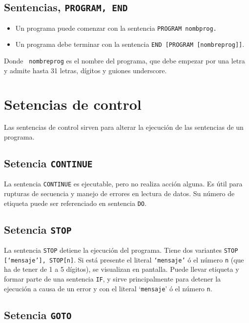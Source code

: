 \subsection{Sentencias, {\tt PROGRAM, END}}

\begin{itemize}
	\item Un programa puede comenzar con la sentencia {\tt PROGRAM nombprog.}
	\item Un programa debe terminar con la sentencia {\tt END  [PROGRAM [nombreprog]]}.
\end{itemize}
Donde \texttt{ nombreprog} es el nombre del programa, que debe empezar por una letra y admite hasta 31 letras, dígitos y guiones underscore.

\section{Setencias de control}

Las sentencias de control sirven para alterar la ejecución de las sentencias de un programa.



\subsection{Setencia {\tt CONTINUE}}

La sentencia \texttt{CONTINUE} es ejecutable, pero no realiza acción alguna. Es útil para rupturas de secuencia y manejo de errores en lectura de datos. Su número de etiqueta puede ser referenciado en sentencia \texttt{DO}.

\subsection{Setencia {\tt STOP}}

La sentencia {\tt STOP} detiene la ejecución del programa. Tiene dos variantes {\tt STOP [`mensaje'], STOP[n]}. Si está presente el literal {\tt `mensaje'} ó el número {\tt  n} (que ha de tener de 1 a 5 dígitos), se visualizan en pantalla. Puede llevar etiqueta y formar parte de una sentencia {\tt IF}, y sirve principalmente para detener la ejecución a causa de un error y con el literal `{\tt mensaje}' ó el número {\tt n}.

\subsection{Setencia {\tt GOTO}}

